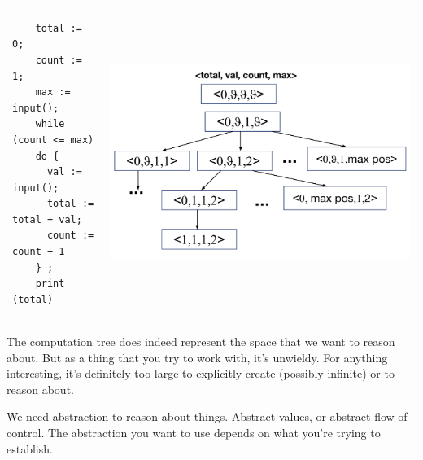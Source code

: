 \documentclass[11pt]{article}
\begin{document}
\begin{tabular}{ll}
\begin{minipage}{.4\textwidth}
  \begin{lstlisting}
    total := 0;
    count := 1;
    max := input();
    while (count <= max)
    do {
      val := input();
      total := total + val;
      count := count + 1
    } ;
    print (total)
\end{lstlisting}
\end{minipage}
&
\begin{minipage}{.6\textwidth}
  \includegraphics[width=\textwidth]{L05/computation-tree.png}
\end{minipage}
\end{tabular}

The computation tree does indeed represent the space that we want to reason
about. But as a thing that you try to work with, it's unwieldy.
For anything interesting, it's definitely too large to explicitly
create (possibly infinite) or to reason about.

We need abstraction to reason about things. Abstract values, or abstract
flow of control. The abstraction you want to use depends on what you're
trying to establish.
\end{document}
